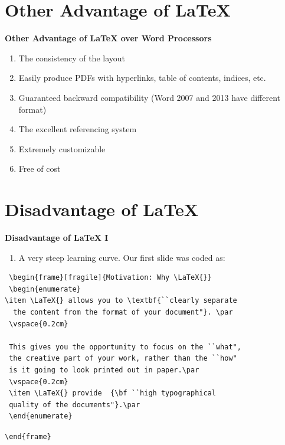 \documentclass[xcolor=dvipsnames]{beamer}
\begin{document}
\section{Other Advantage of \LaTeX}
\begin{frame}{\textbf{Other Advantage of \LaTeX{} over Word Processors}}
\begin{enumerate}[<+->]
\item The consistency of the layout
\vspace{0.2cm}
\item Easily produce PDFs with hyperlinks, table of contents, indices, etc.
\vspace{0.2cm}
\item Guaranteed backward compatibility (Word 2007 and 2013 have different format)
\vspace{0.2cm}
\item The excellent referencing system
\vspace{0.2cm}
\item Extremely customizable
\vspace{0.2cm}
\item Free of cost
\vspace{0.2cm}
\end{enumerate}
\end{frame}

\section{Disadvantage of \LaTeX}
\begin{frame}[fragile]{\textbf{Disadvantage of \LaTeX{} I}}
\begin{enumerate} \item A very steep learning curve. Our first slide was coded as:
\end{enumerate}
\vspace{-0.5cm}
\small \color{gray!80!blue}
\begin{verbatim}
 \begin{frame}[fragile]{Motivation: Why \LaTeX{}}
 \begin{enumerate}
\item \LaTeX{} allows you to \textbf{``clearly separate
  the content from the format of your document"}. \par
 \vspace{0.2cm}
 
 This gives you the opportunity to focus on the ``what", 
 the creative part of your work, rather than the ``how" 
 is it going to look printed out in paper.\par
 \vspace{0.2cm}
 \item \LaTeX{} provide  {\bf ``high typographical 
 quality of the documents"}.\par
 \end{enumerate}
\end{verbatim}
 \verb|\end{frame}|


\end{frame}
\end{document}
